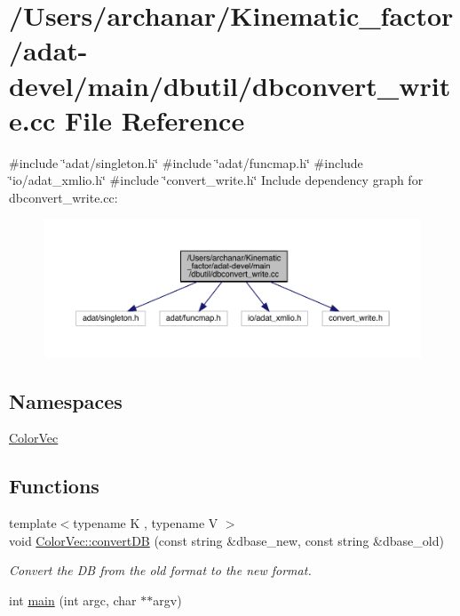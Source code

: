 \hypertarget{adat-devel_2main_2dbutil_2dbconvert__write_8cc}{}\section{/\+Users/archanar/\+Kinematic\+\_\+factor/adat-\/devel/main/dbutil/dbconvert\+\_\+write.cc File Reference}
\label{adat-devel_2main_2dbutil_2dbconvert__write_8cc}
{\ttfamily \#include \char`\"{}adat/singleton.\+h\char`\"{}}\newline
{\ttfamily \#include \char`\"{}adat/funcmap.\+h\char`\"{}}\newline
{\ttfamily \#include \char`\"{}io/adat\+\_\+xmlio.\+h\char`\"{}}\newline
{\ttfamily \#include \char`\"{}convert\+\_\+write.\+h\char`\"{}}\newline
Include dependency graph for dbconvert\+\_\+write.\+cc\+:
\nopagebreak
\begin{figure}[H]
\begin{center}
\leavevmode
\includegraphics[width=350pt]{df/d1f/adat-devel_2main_2dbutil_2dbconvert__write_8cc__incl}
\end{center}
\end{figure}
\subsection*{Namespaces}
\begin{DoxyCompactItemize}
\item 
 \mbox{\hyperlink{namespaceColorVec}{Color\+Vec}}
\end{DoxyCompactItemize}
\subsection*{Functions}
\begin{DoxyCompactItemize}
\item 
{\footnotesize template$<$typename K , typename V $>$ }\\void \mbox{\hyperlink{namespaceColorVec_a2de43a353cb0439d273dacf739397303}{Color\+Vec\+::convert\+DB}} (const string \&dbase\+\_\+new, const string \&dbase\+\_\+old)
\begin{DoxyCompactList}\small\item\em Convert the DB from the old format to the new format. \end{DoxyCompactList}\item 
int \mbox{\hyperlink{adat-devel_2main_2dbutil_2dbconvert__write_8cc_a3c04138a5bfe5d72780bb7e82a18e627}{main}} (int argc, char $\ast$$\ast$argv)
\end{DoxyCompactItemize}


